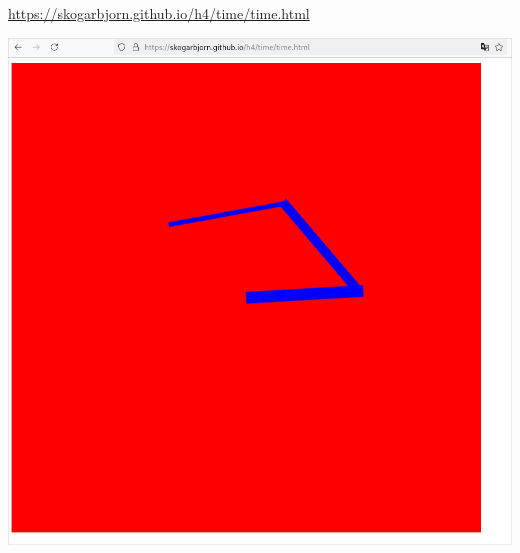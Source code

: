 \documentclass{article}
\begin{document}
		\url{https://skogarbjorn.github.io/h4/time/time.html}
		\begin{center}
			\includegraphics[scale=0.35]{time.png}
		\end{center}
\end{document}
